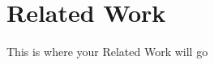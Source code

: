 \documentclass[./dissertation.tex]{subfiles}
\begin{document}
    \section{Related Work}
    This is where your Related Work will go
\end{document}
